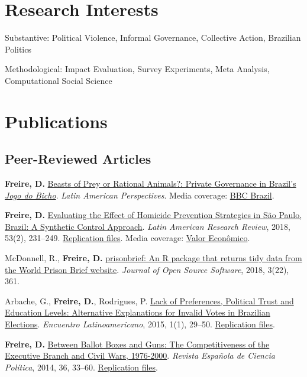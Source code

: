\documentclass[a4paper]{article}
\renewenvironment{itemize}{
  \begin{list}{}{
    \setlength{\leftmargin}{1.5em}
  }
}{
  \end{list}
}
\begin{document}
\section*{Research Interests}

\begin{itemize}
 	\item Substantive: Political Violence, Informal Governance, Collective Action, Brazilian Politics %
 	\item Methodological: Impact Evaluation, Survey Experiments, Meta Analysis, Computational Social Science 
\end{itemize}


\section*{Publications}

\subsection*{Peer-Reviewed Articles}

\begin{itemize}
	\item \textbf{Freire, D.} \href{https://doi.org/10.1177/0094582X19846519}{Beasts of Prey or Rational Animals?: Private Governance in Brazil's \emph{Jogo do Bicho}}. \textit{Latin American Perspectives}. Media coverage: \href{http://www.bbc.com/portuguese/brasil-40140693}{BBC Brazil}.
	\item \textbf{Freire, D.} \href{https://larrlasa.org/articles/10.25222/larr.334/}{Evaluating the Effect of Homicide Prevention Strategies in São Paulo, Brazil: A Synthetic Control Approach}. \textit{Latin American Research Review}, 2018, 53(2), 231--249. \href{https://github.com/danilofreire/homicides-sp-synth}{Replication files}. Media coverage: \href{http://www.valor.com.br/cultura/5111524/sangue-no-asfalto}{Valor Econômico}.
	\item McDonnell, R., \textbf{Freire, D.} \href{https://doi.org/10.21105/joss.00361}{prisonbrief: An R package that returns tidy data from the World Prison Brief website}. \textit{Journal of Open Source Software}, 2018, 3(22), 361. 
	\item Arbache, G., \textbf{Freire, D.}, Rodrigues, P. \href{http://www.iapss.org/wp-content/uploads/2014/10/ELA1.1_2.Lack-of-Preferences-Political-Trust-and-Education-Levels.pdf}{Lack of Preferences, Political Trust and Education Levels: Alternative Explanations for Invalid Votes in Brazilian Elections}. \textit{Encuentro Latinoamericano}, 2015, 1(1), 29--50. \href{https://github.com/danilofreire/invalid-votes-brazil}{Replication files}.
	\item \textbf{Freire, D.} \href{http://recyt.fecyt.es/index.php/recp/article/view/37638}{Between Ballot Boxes and Guns: The Competitiveness of the Executive Branch and Civil Wars, 1976-2000}. \textit{Revista Espa\~{n}ola de Ciencia Pol\'{i}tica}, 2014, 36, 33--60. \href{https://doi.org/10.7910/DVN/NSDUYG}{Replication files}.
\end{itemize}
\end{document}
